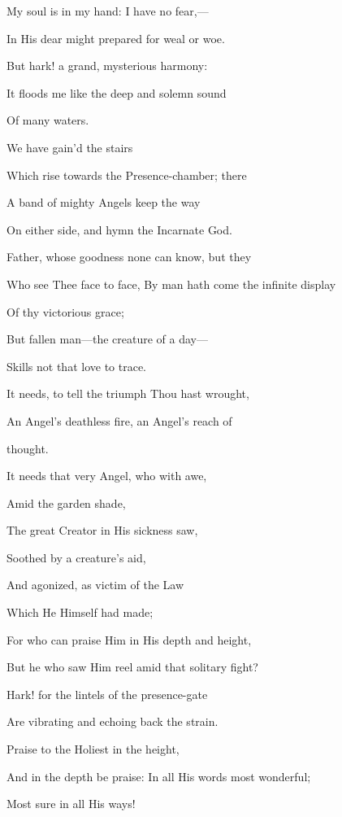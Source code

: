 My soul is in my hand: I have no fear,—

In His dear might prepared for weal or woe.

But hark! a grand, mysterious harmony:

It floods me like the deep and solemn sound

Of many waters.


We have gain'd the stairs

Which rise towards the Presence-chamber; there

A band of mighty Angels keep the way

On either side, and hymn the Incarnate God.


Father, whose goodness none can know, but they

Who see Thee face
to face, By man hath come the infinite display

Of thy victorious
grace;

But fallen man—the creature of a day—

Skills not that
love to trace.

It needs, to tell the triumph Thou hast wrought,

An Angel's deathless fire, an Angel's reach of

thought.

It needs that very Angel, who with awe,

Amid the garden
shade,

The great Creator in His sickness saw,

Soothed by a
creature's aid,

And agonized, as victim of the Law

Which He Himself
had made;

For who can praise Him in His depth and height,

But he who saw Him reel amid that solitary fight?


Hark! for the lintels of the presence-gate

Are vibrating and echoing back the strain.


Praise to
the Holiest in the height,

And in the depth be praise: In all
His words most wonderful;

Most sure in all His ways!

